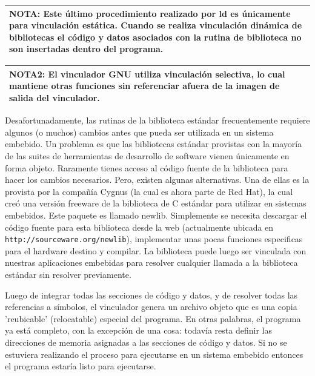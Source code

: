 \documentclass[output=paper, 
colorlinks,
citecolor=brown,
newtxmath
]{langscibook}
\begin{document}
\begin{center}
\begin{tabularx}{\textwidth}{|X|}
\hline
\rowcolor{lightgray}
\textbf{NOTA: Este último procedimiento realizado por ld es únicamente para vinculación
estática. Cuando se realiza vinculación dinámica de bibliotecas el código 
y datos asociados con la rutina de biblioteca no son insertadas dentro
del programa.}\\
\hline
\end{tabularx}
\end{center}

\begin{center}
\begin{tabularx}{\textwidth}{|X|}
\hline
\rowcolor{lightgray}
\textbf{NOTA2: El vinculador GNU utiliza vinculación selectiva, lo cual mantiene
otras funciones sin referenciar afuera de la imagen de salida
del vinculador.}\\
\hline
\end{tabularx}
\end{center}

Desafortunadamente, las rutinas de la biblioteca estándar frecuentemente requiere 
algunos (o muchos) cambios antes que pueda ser utilizada en un sistema embebido.
Un problema es que las bibliotecas estándar provistas con la mayoría de las 
suites de herramientas de desarrollo de software vienen únicamente en forma objeto.
Raramente tienes acceso al código fuente de la biblioteca para hacer los 
cambios necesarios. Pero, existen algunas alternativas. Una de ellas es
la provista por la compañía Cygnus (la cual es ahora parte de Red Hat),
la cual creó una versión freeware de la biblioteca de C estándar para utilizar 
en sistemas embebidos.
Este paquete es llamado newlib. Simplemente se necesita descargar el código fuente
para esta biblioteca desde la web (actualmente ubicada en \texttt{http://sourceware.org/newlib}),
implementar unas pocas funciones especificas para el hardware destino y compilar.
La biblioteca puede luego ser vinculada con nuestras aplicaciones embebidas
para resolver cualquier llamada a la biblioteca estándar sin resolver previamente.

Luego de integrar todas las secciones de código y datos, y de resolver todas
las referencias a símbolos, el vinculador genera un archivo objeto que es
una copia 'reubicable' (relocatable) especial del programa. En otras palabras,
el programa ya está completo, con la excepción de una cosa: todavía
resta definir las direcciones de memoria asignadas a las secciones de código y 
datos. Si no se estuviera realizando el proceso para ejecutarse en un 
sistema embebido entonces el programa estaría listo para ejecutarse.
\end{document}

